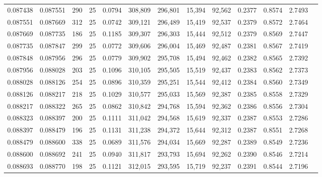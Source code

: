 \begin{tabular}{rrrrrrrrrrrrr}
0.087438 & 0.087551 &   290 &  25 &                                     0.0794 & 308,809 & 296,801 &  15,394 &  92,562 & 0.2377 & 0.8574 & 2.7493 \\
0.087551 & 0.087669 &   312 &  25 &                                     0.0742 & 309,121 & 296,489 &  15,419 &  92,537 & 0.2379 & 0.8572 & 2.7464 \\
0.087669 & 0.087735 &   186 &  25 &                                     0.1185 & 309,307 & 296,303 &  15,444 &  92,512 & 0.2379 & 0.8569 & 2.7447 \\
0.087735 & 0.087847 &   299 &  25 &                                     0.0772 & 309,606 & 296,004 &  15,469 &  92,487 & 0.2381 & 0.8567 & 2.7419 \\
0.087848 & 0.087956 &   296 &  25 &                                     0.0779 & 309,902 & 295,708 &  15,494 &  92,462 & 0.2382 & 0.8565 & 2.7392 \\
0.087956 & 0.088028 &   203 &  25 &                                     0.1096 & 310,105 & 295,505 &  15,519 &  92,437 & 0.2383 & 0.8562 & 2.7373 \\
0.088028 & 0.088126 &   254 &  25 &                                     0.0896 & 310,359 & 295,251 &  15,544 &  92,412 & 0.2384 & 0.8560 & 2.7349 \\
0.088126 & 0.088217 &   218 &  25 &                                     0.1029 & 310,577 & 295,033 &  15,569 &  92,387 & 0.2385 & 0.8558 & 2.7329 \\
0.088217 & 0.088322 &   265 &  25 &                                     0.0862 & 310,842 & 294,768 &  15,594 &  92,362 & 0.2386 & 0.8556 & 2.7304 \\
0.088323 & 0.088397 &   200 &  25 &                                     0.1111 & 311,042 & 294,568 &  15,619 &  92,337 & 0.2387 & 0.8553 & 2.7286 \\
0.088397 & 0.088479 &   196 &  25 &                                     0.1131 & 311,238 & 294,372 &  15,644 &  92,312 & 0.2387 & 0.8551 & 2.7268 \\
0.088479 & 0.088600 &   338 &  25 &                                     0.0689 & 311,576 & 294,034 &  15,669 &  92,287 & 0.2389 & 0.8549 & 2.7236 \\
0.088600 & 0.088692 &   241 &  25 &                                     0.0940 & 311,817 & 293,793 &  15,694 &  92,262 & 0.2390 & 0.8546 & 2.7214 \\
0.088693 & 0.088770 &   198 &  25 &                                     0.1121 & 312,015 & 293,595 &  15,719 &  92,237 & 0.2391 & 0.8544 & 2.7196 \\

\end{tabular}
